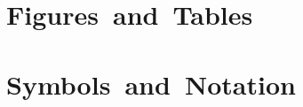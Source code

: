 \documentclass[%
  type=bsc,%
  colorback,%
  bibliography=totoc,%
  bigchapter,%
  twoside,%
  openleft,%
  accentcolor=tud1c%
]{tudthesis}
\author{\StudentName}
\newcommand{\content}{%
  }
\newcommand{\StudentName}{Sebastian Rinder}
\begin{document}
%
  \makethesistitle                          %
  
%
%
%
%
\setcounter{tocdepth}{2}
  \tableofcontents
%
  \chapter*{Figures~and~Tables}
  \begingroup                               %
    \let\clearpage\relax
    \listoffigures\listoftables
  \endgroup
%
  \chapter*{Symbols~and~Notation}
  
%
%
  \content                                  %
%
  \cleardoublepage
  \nocite{*}                                %
%
  \cleardoublepage
  \appendix            %
%
\end{document}
